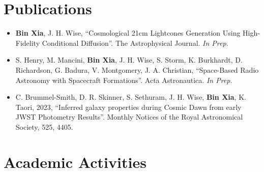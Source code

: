 \documentclass[a4paper,12pt]{article}
\begin{document}
\section{Publications}

\begin{itemize}[leftmargin=0cm]
\setlength{\itemsep}{-5pt}
\item[] \textbf{Bin Xia}, J. H. Wise, ``Cosmological 21cm Lightcones Generation Using High-Fidelity Conditional Diffusion''. The Astrophysical Journal. \textit{In Prep}.
\item[] S. Henry, M. Mancini, \textbf{Bin Xia}, J. H. Wise, S. Storm, K. Burkhardt, D. Richardson, G. Badura, V. Montgomery, J. A. Christian, ``Space-Based Radio Astronomy with Spacecraft Formations''. Acta Astronautica. \textit{In Prep}.
\item[] C. Brummel-Smith, D. R. Skinner, S. Sethuram, J. H. Wise, \textbf{Bin Xia}, K. Taori, 2023, “Inferred galaxy
properties during Cosmic Dawn from early JWST Photometry Results”. Monthly Notices of the Royal Astronomical Society, 525, 4405.
\end{itemize}

\section{Academic Activities}
\end{document}
